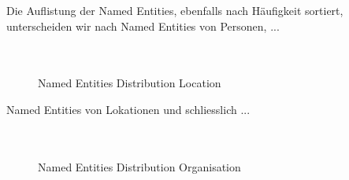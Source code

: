 \documentclass[10pt]{report}
\begin{document}
\noindent Die Auflistung der Named Entities, ebenfalls nach Häufigkeit sortiert, unterscheiden wir nach Named Entities von Personen, ... \\\\\\


\begin{figure}[H]
	\begin{center}		
  	 \end{center}
	\caption{Named Entities Distribution Location}	
 \end{figure}


\noindent Named Entities von Lokationen und schliesslich ...\\\\\\


\begin{figure}[H]
	\begin{center}		
  	 \end{center}
	\caption{Named Entities Distribution Organisation}	
 \end{figure}
\end{document}

